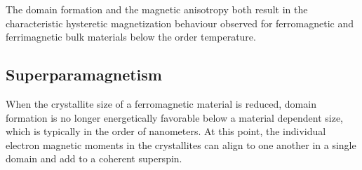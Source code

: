 \documentclass[\main/dresen_thesis.tex]{subfiles}
\begin{document}
    The domain formation and the magnetic anisotropy both result in the characteristic hysteretic magnetization behaviour observed for ferromagnetic and ferrimagnetic bulk materials below the order temperature.

  \subsection{Superparamagnetism}
    When the crystallite size of a ferromagnetic material is reduced, domain formation is no longer energetically favorable below a material dependent size, which is typically in the order of nanometers.
    At this point, the individual electron magnetic moments in the crystallites can align to one another in a single domain and add to a coherent superspin.
\end{document}
